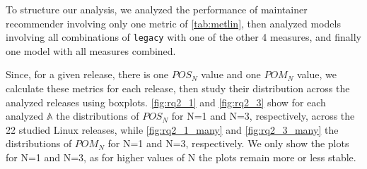 To structure our analysis, we analyzed the performance of maintainer recommender involving only one metric of \autoref{tab:metlin}, then analyzed models involving all combinations of \texttt{legacy} with one of the other 4 measures, and finally one model with all measures combined. 

Since, for a given release, there is one $POS_N$ value and one $POM_N$ value, we calculate these metrics for each release, then study their distribution across the analyzed releases using boxplots. %
\autoref{fig:rq2_1} and \autoref{fig:rq2_3} show for each analyzed $\mathbb{A}$ %
the distributions of $POS_N$ for N=1 and N=3, respectively, across the 22 studied Linux releases, while \autoref{fig:rq2_1_many} and \autoref{fig:rq2_3_many} the distributions of $POM_N$ for N=1 and N=3, respectively. %
We only show the plots for N=1 and N=3, as for higher values of N the plots remain more or less stable.





